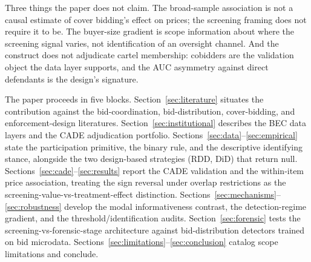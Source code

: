 Three things the paper does not claim. The broad-sample
association is not a causal estimate of cover bidding's effect
on prices; the screening framing does not require it to be.
The buyer-size gradient is scope information about where the
screening signal varies, not identification of an oversight
channel. And the construct does not adjudicate cartel
membership: cobidders are the validation object the data layer
supports, and the AUC asymmetry against direct defendants is
the design's signature.

The paper proceeds in five blocks.
Section~\ref{sec:literature} situates the contribution against
the bid-coordination, bid-distribution, cover-bidding, and
enforcement-design literatures.
Section~\ref{sec:institutional} describes the BEC data layers
and the CADE adjudication portfolio.
Sections~\ref{sec:data}--\ref{sec:empirical} state the
participation primitive, the binary rule, and the descriptive
identifying stance, alongside the two design-based strategies
(RDD, DiD) that return null.
Sections~\ref{sec:cade}--\ref{sec:results} report the CADE
validation and the within-item price association, treating the
sign reversal under overlap restrictions as the
screening-value-vs-treatment-effect distinction.
Sections~\ref{sec:mechanisms}--\ref{sec:robustness} develop the
modal informativeness contrast, the detection-regime gradient,
and the threshold/identification audits.
Section~\ref{sec:forensic} tests the screening-vs-forensic-stage
architecture against bid-distribution detectors trained on bid
microdata.
Sections~\ref{sec:limitations}--\ref{sec:conclusion} catalog
scope limitations and conclude.
